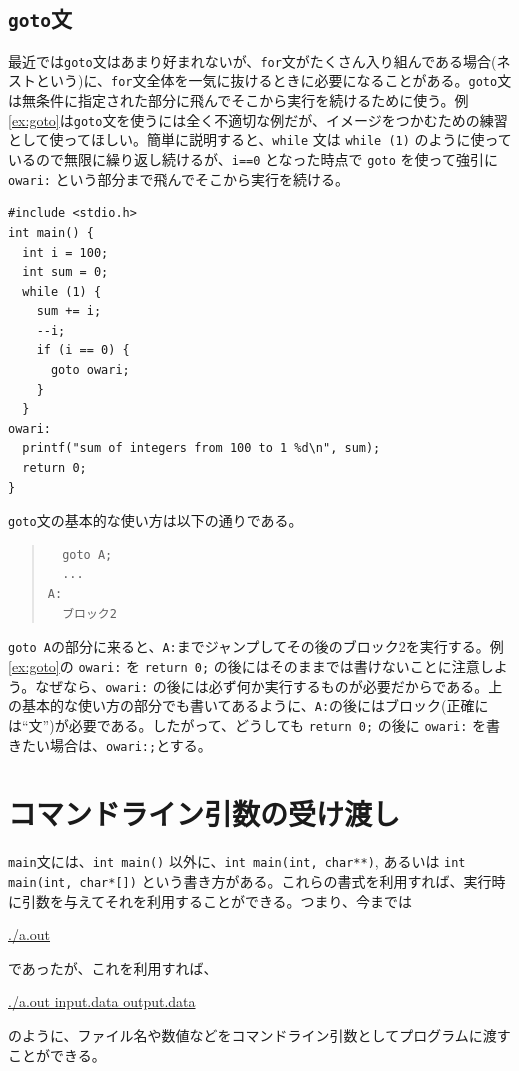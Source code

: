 \subsection{{\tt goto}文}
最近では\verb|goto|文はあまり好まれないが、\verb|for|文がたくさん入り組んである場合(ネストという)に、\verb|for|文全体を一気に抜けるときに必要になることがある。\verb|goto|文は無条件に指定された部分に飛んでそこから実行を続けるために使う。例\ref{ex:goto}は\verb|goto|文を使うには全く不適切な例だが、イメージをつかむための練習として使ってほしい。簡単に説明すると、\verb|while| 文は \verb|while (1)| のように使っているので無限に繰り返し続けるが、\verb|i==0| となった時点で \verb|goto| を使って強引に \verb|owari:| という部分まで飛んでそこから実行を続ける。
%
\begin{reidai}\label{ex:goto}
\begin{verbatim}
#include <stdio.h>
int main() {
  int i = 100;
  int sum = 0;
  while (1) {
    sum += i;
    --i;
    if (i == 0) {
      goto owari;
    }
  }
owari:
  printf("sum of integers from 100 to 1 %d\n", sum);
  return 0;
}
\end{verbatim}
\end{reidai} \noindent
%
\verb|goto|文の基本的な使い方は以下の通りである。
\begin{quote}
\begin{verbatim}
  goto A;
  ...
A:
  ブロック2
\end{verbatim}
\end{quote}
\verb|goto A|の部分に来ると、\verb|A:|までジャンプしてその後のブロック2を実行する。例\ref{ex:goto}の \verb|owari:| を \verb|return 0;| の後にはそのままでは書けないことに注意しよう。なぜなら、\verb|owari:| の後には必ず何か実行するものが必要だからである。上の基本的な使い方の部分でも書いてあるように、\verb|A:|の後にはブロック(正確には``文'')が必要である。したがって、どうしても \verb|return 0;| の後に \verb|owari:| を書きたい場合は、\verb|owari:;|とする。

\section{コマンドライン引数の受け渡し}
{\tt main}文には、\verb|int main()| 以外に、\verb|int main(int, char**)|, あるいは \verb|int main(int, char*[])| という書き方がある。これらの書式を利用すれば、実行時に引数を与えてそれを利用することができる。つまり、今までは
\begin{commandline2}
\prompt \underline{./a.out}
\end{commandline2} \noindent
であったが、これを利用すれば、
\begin{commandline2}
\prompt \underline{./a.out input.data output.data}
\end{commandline2} \noindent
のように、ファイル名や数値などをコマンドライン引数としてプログラムに渡すことができる。

